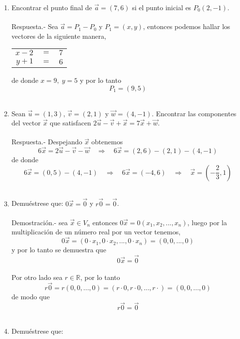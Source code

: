 \begin{enumerate}

\item Encontrar el punto final de $\vec{a}=(7,6)$ si el punto inicial es $P_0(2,-1)$.\\\\
    Respuesta.-\; Sea $\vec{a}=P_1-P_0$ y $P_1=(x,y)$, entonces podemos hallar los vectores de la siguiente manera,
    \begin{center}
    \begin{tabular}{rcl}
	$x-2$&$=$&$7$\\
	$y+1$&$=$&$6$\\
    \end{tabular}
    \end{center}
    de donde $x=9, \; y=5$ y por lo tanto $$P_1=(9,5)$$\\

\item Sean $\vec{u}=(1,3)$,  $\vec{v}=(2,1)$ y $\vec{w}=(4,-1)$. Encontrar las componentes del vector $\vec{x}$ que satisfacen $2\vec{u}-\vec{v}+\vec{x}=7\vec{x}+\vec{w}$.\\\\
    Respuesta.-\; Despejando $\vec{x}$ obtenemos $$6\vec{x}=2\vec{u}-\vec{v}-\vec{w} \quad \Longrightarrow\quad 6\vec{x}=(2,6)-(2,1)-(4,-1)$$ 
    de donde $$6\vec{x}=(0,5)-(4,-1)\quad \Longrightarrow \quad 6\vec{x}=(-4,6) \quad \Longrightarrow \quad \vec{x}=\left(-\dfrac{2}{3},1\right)$$\\

\item Demuéstrese que: $0\vec{x}=\vec{0}$ y $r\vec{0}=\vec{0}$.\\\\
    Demostración.-\; sea $\vec{x}\in V_n$ entonces $0\vec{x}=0(x_1,x_2,...,x_n)$, luego por la multiplicación de un número real por un vector tenemos, $$0\vec{x}=(0\cdot x_1,0\cdot x_2,...,0\cdot x_n)=(0,0,...,0)$$
    y por lo tanto se demuestra que $$0\vec{x}=\vec{0}$$\\
    Por otro lado sea $r\in \mathbb{R}$, por lo tanto $$r\vec{0}=r(0,0,...,0)=(r\cdot 0,r\cdot 0,...,r\cdot)=(0,0,...,0)$$
    de modo que $$r\vec{0}=\vec{0}$$\\
    \vspace{4cm}

\item Demuéstrese que:
\begin{enumerate}[\bfseries a)]


\end{enumerate}
\end{enumerate}

